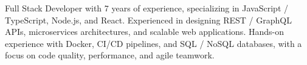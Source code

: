 \par{
Full Stack Developer with 7 years of experience, specializing in JavaScript / TypeScript, Node.js, and React. Experienced in designing REST / GraphQL APIs, microservices architectures, and scalable web applications. Hands-on experience with Docker, CI/CD pipelines, and SQL / NoSQL databases, with a focus on code quality, performance, and agile teamwork.
}
